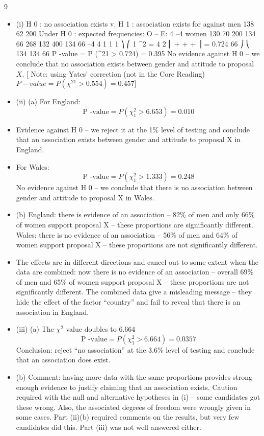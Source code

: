 \documentclass[a4paper,12pt]{article}
\begin{document}
\newpage
9
\begin{itemize}
\item (i)
H 0 : no association exists v. H 1 : association exists
for
against
men
138
62
200
Under H 0 : expected frequencies:
O – E:
4
–4
women
130
70
200
134
66
268
132
400
134
66
–4
4
1
1
1 ⎞
⎛ 1
\chi^2 = 4 2 ⎜
+
+
+
⎟ = 0.724
66 ⎠
⎝ 134 134 66
P -value = P (\chi^21 > 0.724) = 0.395
No evidence against H 0 – we conclude that no association exists between gender and attitude to proposal $X$.
[ Note: using Yates’ correction (not in the Core Reading)
$P -value = P (\chi^21 > 0.554) = 0.457]$
\item (ii)
(a)
For England:
\[\mbox{P -value} = P ( \chi^{2}_{1} > 6.653) = 0.010\]
\item 
Evidence against H 0 – we reject it at the 1\% level of testing and conclude that an association exists between gender and attitude to
proposal X in England.
\item For Wales:
\[\mbox{P -value} = P ( \chi^{2}_{1} > 1.333) = 0.248\]
No evidence against H 0 – we conclude that there is no association
between gender and attitude to proposal X in Wales.

\item (b)
England: there is evidence of an association – 82\% of men and only 66\% of women support proposal X – these proportions are
significantly different.
Wales: there is no evidence of an association – 56\% of men and 64\% of women support proposal X – these proportions are not significantly different.
\item The effects are in different directions and cancel out to some extent when the data are combined: now there is no evidence of an
association – overall 69\% of men and 65\% of women support proposal
X – these proportions are not significantly different.
The combined data give a misleading message – they hide the effect of the factor “country” and fail to reveal that there is an association in England.
\item (iii)
(a)
The $\chi^2$ value doubles to 6.664
\[\mbox{P -value} = P ( \chi^{2}_{1} > 6.664) = 0.0357\]
Conclusion: reject “no association” at the 3.6\% level of testing and
conclude that an association does exist.
\item (b)
Comment: having more data with the same proportions provides strong enough evidence to justify claiming that an association exists.
Caution required with the null and alternative hypotheses in (i) – some candidates got these wrong. Also, the associated degrees of freedom were wrongly given in some cases. Part (ii)(b) required comments on the results, but very few candidates did this. Part (iii) was not well answered either.
\end{itemize}
\end{document}
